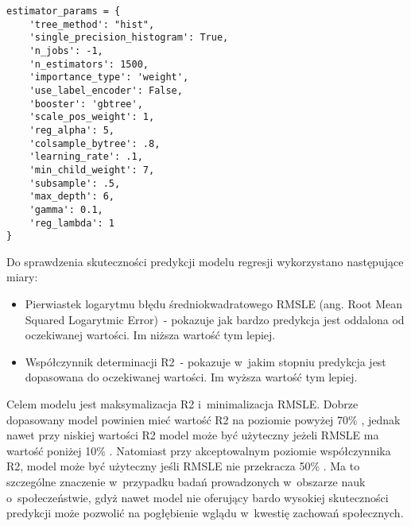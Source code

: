 \noindent\begin{minipage}{\textwidth}
             \begin{lstlisting}[caption={Parametry estmatora}, label={listing:estimator_params}]
             \end{lstlisting}
             \hspace{.075\textwidth}\begin{minipage}{.85\textwidth}
                                        \begin{verbatim}
estimator_params = {
    'tree_method': "hist",
    'single_precision_histogram': True,
    'n_jobs': -1,
    'n_estimators': 1500,
    'importance_type': 'weight',
    'use_label_encoder': False,
    'booster': 'gbtree',
    'scale_pos_weight': 1,
    'reg_alpha': 5,
    'colsample_bytree': .8,
    'learning_rate': .1,
    'min_child_weight': 7,
    'subsample': .5,
    'max_depth': 6,
    'gamma': 0.1,
    'reg_lambda': 1
}
        \end{verbatim}
     \end{minipage}

     \raggedright\source{\ownwork}
     \vspace{0.75cm}
\end{minipage}

Do sprawdzenia skuteczności predykcji modelu regresji wykorzystano następujące miary:
\begin{itemize}
    \item Pierwiastek logarytmu błędu średniokwadratowego RMSLE (ang. Root Mean Squared Logarytmic Error)~- pokazuje jak bardzo predykcja jest oddalona od oczekiwanej wartości. Im niższa wartość tym lepiej.
    \item Współczynnik determinacji R2~- pokazuje w~jakim stopniu predykcja jest dopasowana do oczekiwanej wartości. Im wyższa wartość tym lepiej.
    \end{itemize}

Celem modelu jest maksymalizacja R2 i~minimalizacja RMSLE. Dobrze dopasowany model powinien mieć wartość R2 na poziomie powyżej 70\% \cite{r2-good-value}, jednak nawet przy niskiej wartości R2 model może być użyteczny jeżeli RMSLE ma wartość poniżej 10\% \cite{r2-vs-rmse}.
Natomiast przy akceptowalnym poziomie współczynnika R2, model może być użyteczny jeśli RMSLE nie przekracza 50\% \cite{rmse-good-value}.
Ma to szczególne znaczenie w~przypadku badań prowadzonych w~obszarze nauk o~społeczeństwie, gdyż nawet model nie oferujący bardo wysokiej skuteczności predykcji może pozwolić na pogłębienie wglądu w~kwestię zachowań społecznych.

